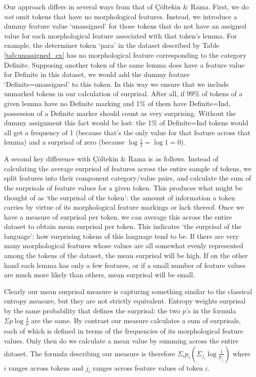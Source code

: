 \documentclass[USenglish]{article}
\begin{document}
Our approach differs in several ways from that of Çöltekin \& Rama.
First, we do \textit{not} omit tokens that have no morphological features.
Instead, we introduce a dummy feature value `unassigned' for those tokens that do not have an assigned value for each morphological feature associated with that token's lemma.
For example, the determiner token `para' in the dataset described by Table \ref{tab:unassigned_ex} has no morphological feature corresponding to the category Definite.
Supposing another token of the same lemma does have a feature value for Definite in this dataset, we would add the dummy feature `Definite=unassigned' to this token.
In this way we ensure that we include unmarked tokens in our calculation of surprisal.
After all, if 99\% of tokens of a given lemma have no Definite marking and 1\% of them have Definite=Ind, possession of a Definite marker should count as very surprising.
Without the dummy assignment this fact would be lost: the 1\% of Definite=Ind tokens would all get a frequency of 1 (because that's the only value for that feature across that lemma) and a surprisal of zero (because $\log{\frac{1}{1}}=\log{1}=0$).

A second key difference with Çöltekin \& Rama is as follows.
Instead of calculating the average surprisal of features across the entire sample of tokens, we split features into their component category/value pairs, and calculate the sum of the surprisals of feature values for a given token.
This produces what might be thought of as `the surprisal of the token': the amount of information a token carries by virtue of its morphological feature markings or lack thereof.
Once we have a measure of surprisal per token, we can average this across the entire dataset to obtain mean surprisal per token.
This indicates `the surprisal of the language': how surprising tokens of this language tend to be.
If there are very many morphological features whose values are all somewhat evenly represented among the tokens of the dataset, the mean surprisal will be high.
If on the other hand each lemma has only a few features, or if a small number of feature values are much more likely than others, mean surprisal will be small.

Clearly our mean surprisal measure is capturing something similar to the classical entropy measure, but they are not strictly equivalent.
Entropy weights surprisal by the same probability that defines the surprisal: the two $p$'s in the formula $\Sigma p\log{\frac{1}{p}}$ are the same.
By contrast our measure calculates a sum of surprisals, each of which is defined in terms of the frequencies of its morphological feature values.
Only then do we calculate a mean value by summing across the entire dataset.
The formula describing our measure is therefore $\Sigma_i p_i \left( \Sigma_{j_i} \log{\frac{1}{p_{j_i}}} \right)$ where $i$ ranges across tokens and $j_i$ ranges across feature values of token $i$.
\end{document}
